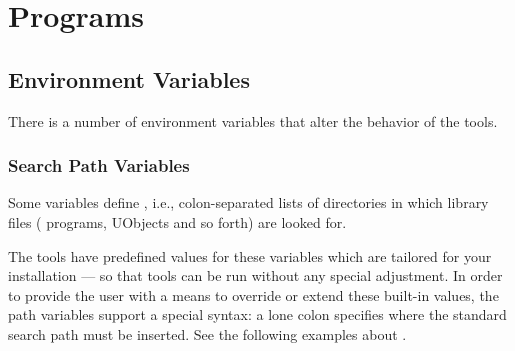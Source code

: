\newcommand{\optionDebug}{
  Set the verbosity level of traces.
  This option is mostly for developers, but it is very useful when
  tracking problems such as a UObject that fails to load properly.
  Valid values for \var{level} are, in increasing verbosity order:
  \begin{enumerate}
  \item \code{NONE}, no log messages at all.
  \item \code{LOG}, the default value.
  \item \code{TRACE}
  \item \code{DEBUG}
  \item \code{DUMP}, maximum verbosity.
  \end{enumerate}
}
\newcommand{\optionHelp}
  {Display the help message and exit successfully.}

\newcommand{\optionVersion}
  {Display version information and exit successfully.}

\chapter{Programs}
\label{sec:tools}

\section{Environment Variables}
\label{sec:tools:envvars}

There is a number of environment variables that alter the behavior of
the \urbi tools.

\subsection{Search Path Variables}

Some variables define , i.e.,
colon-separated lists of directories in which library files (\us
programs, UObjects and so forth) are looked for.

The tools have predefined values for these variables which are
tailored for your installation --- so that \urbi tools can be run
without any special adjustment.  In order to provide the user with a
means to override or extend these built-in values, the path variables
support a special syntax: a lone colon specifies where the standard
search path must be inserted.  See the following examples about
.

